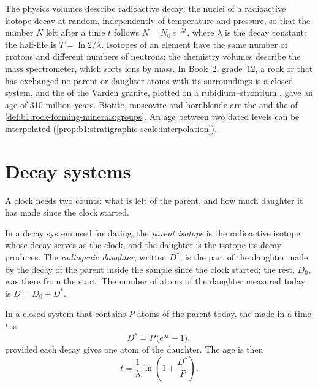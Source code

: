\begin{recall}
The physics volumes describe radioactive decay: the nuclei of a radioactive
isotope decay at random, independently of temperature and pressure, so that the
number $N$ left after a time $t$ follows $N = N_0\,e^{-\lambda t}$, where
$\lambda$ is the decay constant; the half-life is $T = \ln 2/\lambda$. Isotopes
of an element have the same number of protons and different numbers of
neutrons; the chemistry volumes describe the mass spectrometer, which sorts ions
by mass. In Book~2, grade~12, a rock or  that has exchanged no parent or
daughter atoms with its surroundings is a closed system, and the  of the
Varden granite, plotted on a rubidium--strontium , gave an age of 310
million years. Biotite, muscovite and hornblende are the  and the 
of \cref{def:b1:rock-forming-minerals:groups}. An age between two dated levels
can be interpolated (\cref{prop:b1:stratigraphic-scale:interpolation}).
\end{recall}

\section{Decay systems}\label{sec:b1:radiometric-methods:systems}

A clock needs two counts: what is left of the parent, and how much daughter it has
made since the clock started.

\begin{definition}\label{def:b1:radiometric-methods:radiogenic}
In a decay system used for dating, the \emph{parent isotope} is the radioactive isotope whose decay serves as the clock, and the
daughter is the isotope its decay produces. The \emph{radiogenic
daughter}, written $D^*$, is the part of the
daughter made by the decay of the parent inside the sample since the clock
started; the rest, $D_0$, was there from the start. The number of atoms of the
daughter measured today is $D = D_0 + D^*$.
\end{definition}

\begin{proposition}\label{prop:b1:radiometric-methods:growth}
In a closed system that contains $P$ atoms of the parent today, the  made in a time $t$ is
\[
  D^* = P\,\bigl(e^{\lambda t} - 1\bigr),
\]
provided each decay gives one atom of the daughter. The age is then
\[
  t = \frac{1}{\lambda}\,\ln\!\left(1 + \frac{D^*}{P}\right).
\]
\end{proposition}


